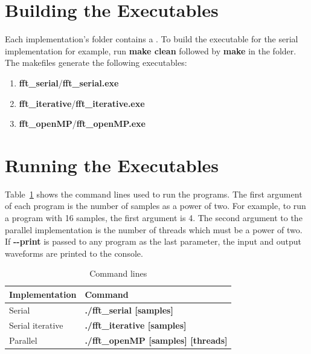 \documentclass{amsart}
\begin{document}
\section{Building the Executables}\label{appendix:building}
Each implementation's folder contains a . To build the executable for the serial implementation for example, run  \textbf{make clean} followed by \textbf{make} in the  folder. The makefiles generate the following executables:

\begin{enumerate}
\item  \textbf{fft\_serial}/\textbf{fft\_serial.exe}
\item \textbf{fft\_iterative}/\textbf{fft\_iterative.exe}
\item \textbf{fft\_openMP}/\textbf{fft\_openMP.exe}
\end{enumerate}

\section{Running the Executables}\label{appendix:running}
Table~\ref{table:execution} shows the command lines used to run the programs. The first argument of each program is the number of samples as a power of two. For example, to run a program with 16 samples, the first argument is 4. The second argument to the parallel implementation is the number of threads which must be a power of two. If \textbf{-\phantom{}-print} is passed to any program as the last parameter, the input and output waveforms are printed to the console.

\begin{table}[htbp]
\caption{Command lines}
\begin{center}
\begin{tabular}{|p{}|p{}|}
\hline
Implementation & Command \\
\hline
Serial & \textbf{./fft\_serial [samples]} \\
Serial iterative & \textbf{./fft\_iterative [samples]} \\
Parallel & \textbf{./fft\_openMP [samples] [threads]} \\
\hline
\end{tabular}
\end{center}
\label{table:execution}
\end{table}
\end{document}
